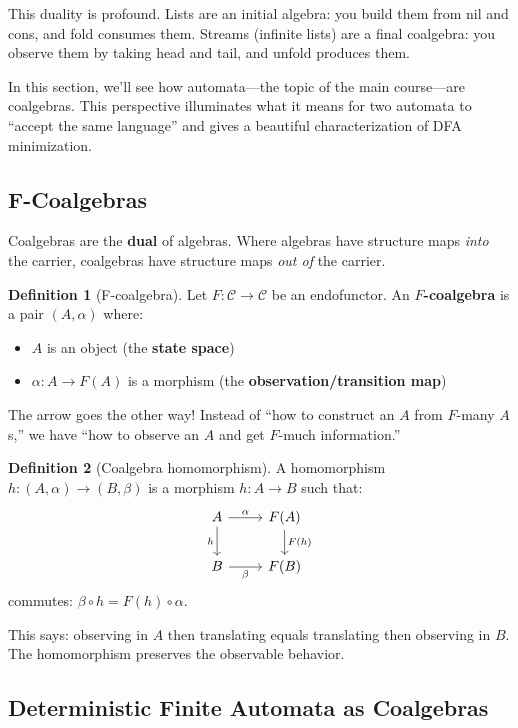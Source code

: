 \documentclass[11pt]{article}
\theoremstyle{definition}
\newtheorem{definition}{Definition}[section]
\theoremstyle{plain}
\theoremstyle{remark}
\begin{document}
This duality is profound. Lists are an initial algebra: you build them from nil and cons, and fold consumes them. Streams (infinite lists) are a final coalgebra: you observe them by taking head and tail, and unfold produces them.

In this section, we'll see how automata---the topic of the main course---are coalgebras. This perspective illuminates what it means for two automata to ``accept the same language'' and gives a beautiful characterization of DFA minimization.

\subsection{F-Coalgebras}

Coalgebras are the \textbf{dual} of algebras. Where algebras have structure maps \emph{into} the carrier, coalgebras have structure maps \emph{out of} the carrier.

\begin{definition}[F-coalgebra]
Let $F: \mathcal{C} \to \mathcal{C}$ be an endofunctor. An \textbf{$F$-coalgebra} is a pair $(A, \alpha)$ where:
\begin{itemize}
  \item $A$ is an object (the \textbf{state space})
  \item $\alpha: A \to F(A)$ is a morphism (the \textbf{observation/transition map})
\end{itemize}
\end{definition}

The arrow goes the other way! Instead of ``how to construct an $A$ from $F$-many $A$s,'' we have ``how to observe an $A$ and get $F$-much information.''

\begin{definition}[Coalgebra homomorphism]
A homomorphism $h: (A, \alpha) \to (B, \beta)$ is a morphism $h: A \to B$ such that:
\[
\begin{tikzcd}
A \arrow[r, "\alpha"] \arrow[d, "h"'] & F(A) \arrow[d, "F(h)"] \\
B \arrow[r, "\beta"'] & F(B)
\end{tikzcd}
\]
commutes: $\beta \circ h = F(h) \circ \alpha$.
\end{definition}

This says: observing in $A$ then translating equals translating then observing in $B$. The homomorphism preserves the observable behavior.

\subsection{Deterministic Finite Automata as Coalgebras}
\end{document}
